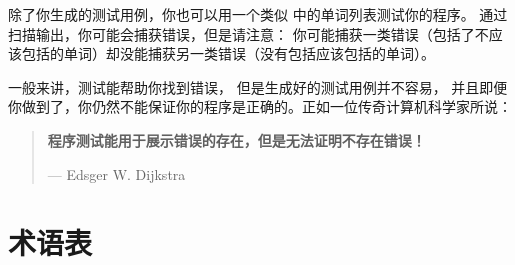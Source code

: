 
除了你生成的测试用例，你也可以用一个类似  中的单词列表测试你的程序。 通过扫描输出，你可能会捕获错误，但是请注意：
你可能捕获一类错误（包括了不应该包括的单词）却没能捕获另一类错误（没有包括应该包括的单词）。



一般来讲，测试能帮助你找到错误， 但是生成好的测试用例并不容易，
并且即便你做到了，你仍然不能保证你的程序是正确的。正如一位传奇计算机科学家所说：
\begin{quote}
{\bf 程序测试能用于展示错误的存在，但是无法证明不存在错误！}

--- Edsger W. Dijkstra
\end{quote}


\section{术语表}

